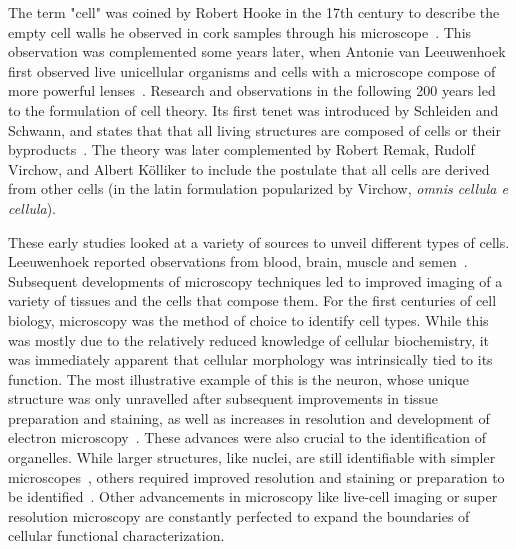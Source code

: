 The term "cell" was coined by Robert Hooke in the 17th century to describe the empty cell walls he observed in cork samples through his microscope~\citep{hooke_micrographia:_1667}. This observation was complemented some years later, when Antonie van Leeuwenhoek first observed live unicellular organisms and cells with a microscope compose of more powerful lenses~\citep{mazzarello_unifying_1999}. Research and observations in the following 200 years led to the formulation of cell theory. Its first tenet was introduced by Schleiden and Schwann, and states that that all living structures are composed of cells or their byproducts~\citep{schwann_microscopical_1847}. The theory was later complemented by Robert Remak, Rudolf Virchow, and Albert Kölliker to include the postulate that all cells are derived from other cells (in the latin formulation popularized by Virchow, \textit{omnis cellula e cellula}).

These early studies looked at a variety of sources to unveil different types of cells. Leeuwenhoek reported observations from blood, brain, muscle and semen~\citep{leeuwenhoeck_m_microscopical_1674,leeuwenhoek_antoni_van_observationes_1677}. Subsequent developments of microscopy techniques led to improved imaging of a variety of tissues and the cells that compose them. For the first centuries of cell biology, microscopy was the method of choice to identify cell types. While this was mostly due to the relatively reduced knowledge of cellular biochemistry, it was immediately apparent that cellular morphology was intrinsically tied to its function. The most illustrative example of this is the neuron, whose unique structure was only unravelled after subsequent improvements in tissue preparation and staining, as well as increases in resolution and development of electron microscopy~\citep{mazzarello_unifying_1999}. These advances were also crucial to the identification of organelles. While larger structures, like nuclei, are still identifiable with simpler microscopes~\citep{brown_organs_1866}, others required improved resolution and staining or preparation to be identified~\citep{golgi_structure_1989}. Other advancements in microscopy like live-cell imaging or super resolution microscopy are constantly perfected to expand the boundaries of cellular functional characterization.


